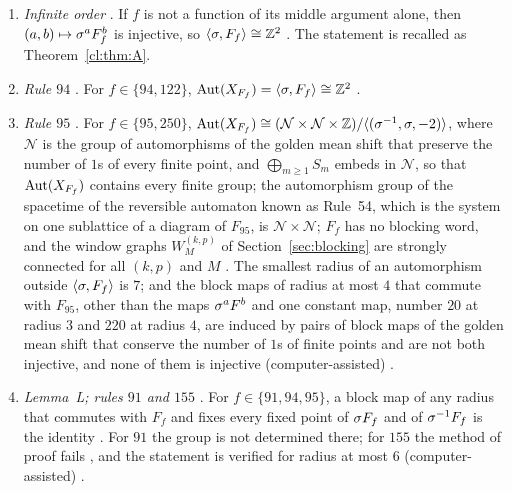 \begin{enumerate}
\item\label{imp:order} \emph{Infinite order} \cite{PaperC}. If $f$ is not a function of its middle argument alone, then $(a,b)\mapsto\sigma^aF_f^b$ is injective, so $\langle\sigma,F_f\rangle\cong\mathbb{Z}^2$ \cite[Theorem~2.4]{PaperC}. The statement is recalled as Theorem~\ref{cl:thm:A}.
\item\label{imp:94} \emph{Rule $94$} \cite{PaperE}. For $f\in\{94,122\}$, $\operatorname{Aut}(X_{F_f})=\langle\sigma,F_f\rangle\cong\mathbb{Z}^2$ \cite[Theorem~A; Theorem~5.9]{PaperE}.
\item\label{imp:95} \emph{Rule $95$} \cite{PaperE}. For $f\in\{95,250\}$, $\operatorname{Aut}(X_{F_f})\cong(\mathcal N\times\mathcal N\times\mathbb{Z})/\langle(\sigma^{-1},\sigma,-2)\rangle$, where $\mathcal N$ is the group of automorphisms of the golden mean shift that preserve the number of $1$s of every finite point, and $\bigoplus_{m\ge1}S_m$ embeds in $\mathcal N$, so that $\operatorname{Aut}(X_{F_f})$ contains every finite group; the automorphism group of the spacetime of the reversible automaton known as Rule~54, which is the system on one sublattice of a diagram of $F_{95}$, is $\mathcal N\times\mathcal N$; $F_f$ has no blocking word, and the window graphs $W^{(k,p)}_M$ of Section~\ref{sec:blocking} are strongly connected for all $(k,p)$ and $M$ \cite[Theorem~B; Theorem~6.9, Corollary~6.10, Propositions~6.17 and~6.18]{PaperE}. The smallest radius of an automorphism outside $\langle\sigma,F_f\rangle$ is $7$; and the block maps of radius at most $4$ that commute with $F_{95}$, other than the maps $\sigma^aF^b$ and one constant map, number $20$ at radius $3$ and $220$ at radius $4$, are induced by pairs of block maps of the golden mean shift that conserve the number of $1$s of finite points and are not both injective, and none of them is injective (computer-assisted) \cite[Proposition~6.15, Lemma~6.20 and Proposition~6.21]{PaperE}.
\item\label{imp:L} \emph{Lemma~L; rules $91$ and $155$} \cite{PaperE}. For $f\in\{91,94,95\}$, a block map of any radius that commutes with $F_f$ and fixes every fixed point of $\sigma F_f$ and of $\sigma^{-1}F_f$ is the identity \cite[Theorem~C; Theorem~3.1, Corollary~3.9]{PaperE}. For $91$ the group is not determined there; for $155$ the method of proof fails \cite[Proposition~8.1]{PaperE}, and the statement is verified for radius at most $6$ (computer-assisted) \cite[Remark~8.2]{PaperE}.
\end{enumerate}

